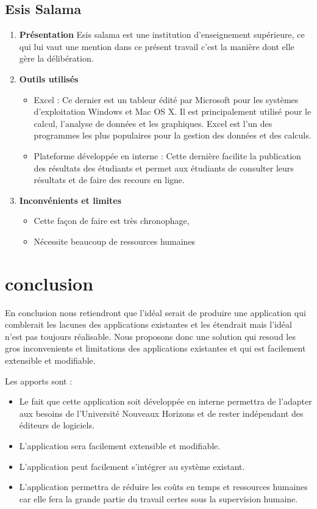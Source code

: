 \subsection{Esis Salama}\label{subsec:esis-salamae}
\begin{enumerate}
    \item \textbf{Présentation} \newline Esis salama est une institution d'enseignement supérieure, ce qui lui vaut une mention dans ce présent travail c'est la manière dont elle gère la délibération.
    \item \textbf{Outils utilisés}
        \begin{itemize}
            \item Excel : Ce dernier est un tableur édité par Microsoft pour les systèmes d'exploitation Windows et Mac OS X. Il est principalement utilisé pour le calcul, l'analyse de données et les graphiques. Excel est l'un des programmes les plus populaires pour la gestion des données et des calculs.
            \item Plateforme développée en interne :  Cette dernière facilite la publication des résultats des étudiants et permet aux étudiants de consulter leurs résultats et de faire des recours en ligne.
        \end{itemize}
    \item \textbf{Inconvénients et limites}
        \begin{itemize}
            \item Cette façon de faire est très chronophage,
            \item Nécessite beaucoup de ressources humaines
        \end{itemize}
\end{enumerate}

\section{conclusion}\label{sec:conclusion}
En conclusion nous retiendront que l'idéal serait de produire
une application qui comblerait les lacunes des applications existantes
et les étendrait mais l'idéal n'est pas toujours réalisable.
Nous proposons donc une solution qui resoud les gros inconvenients
et limitations des applications existantes et qui est facilement
extensible et modifiable.

Les apports sont :
\begin{itemize}
    \item Le fait que cette application soit développée en interne permettra de l'adapter aux besoins de l'Université Nouveaux Horizons et de rester indépendant des éditeurs de logiciels.
    \item L'application sera facilement extensible et modifiable.
    \item L'application peut facilement s'intégrer au système existant.
    \item L'application permettra de réduire les coûts en temps et ressources humaines car elle fera la grande partie du travail certes sous la supervision humaine.
\end{itemize}


